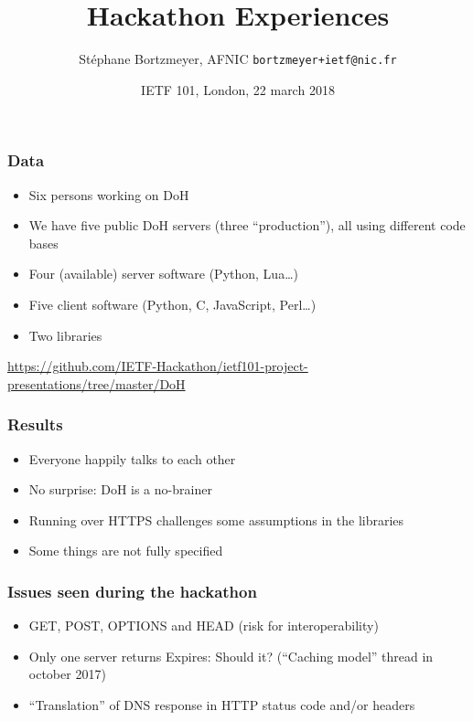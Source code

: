 \documentclass{beamer}
\author[Stéphane Bortzmeyer]
{
  Stéphane Bortzmeyer, AFNIC \texttt{bortzmeyer+ietf@nic.fr}
}
\title[Hackathon]{Hackathon Experiences}
\date[IETF 101]
{IETF 101, London, 22 march 2018}
\begin{document}
\begin{frame}
\titlepage  
\end{frame}

\begin{frame}
  \frametitle{Data}
  \begin{itemize}
  \item Six persons working on DoH
  \item We have five public DoH servers (three ``production''), all
    using different code bases
  \item Four (available) server software (Python, Lua…)
  \item Five client software (Python, C, JavaScript, Perl…)
  \item Two libraries  
  \end{itemize}
  \url{https://github.com/IETF-Hackathon/ietf101-project-presentations/tree/master/DoH}
\end{frame}

\begin{frame}
  \frametitle{Results}
  \begin{itemize}
  \item Everyone happily talks to each other
  \item No surprise: DoH is a no-brainer
  \item Running over HTTPS challenges some assumptions in the libraries   
  \item Some things are not fully specified  
  \end{itemize}
\end{frame}

\begin{frame}
  \frametitle{Issues seen during the hackathon}
  \begin{itemize}
  \item GET, POST, OPTIONS and HEAD (risk for interoperability)
  \item Only one server returns Expires: Should it? (``Caching model''
    thread in october 2017)
  \item ``Translation'' of DNS response in HTTP status code and/or headers  
  \end{itemize}
\end{frame}
\end{document}
